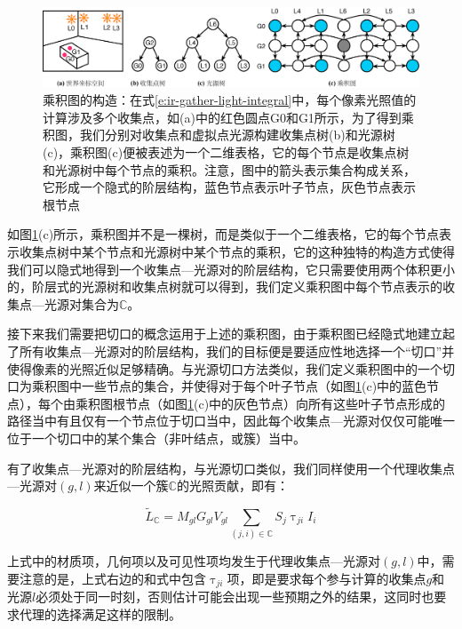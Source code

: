 \begin{figure}
\begin{fullwidth}
	\includegraphics[width=\thewidth]{figures/ir/product-graph}
	\caption{乘积图的构造：在式\ref{e:ir-gather-light-integral}中，每个像素光照值的计算涉及多个收集点，如(a)中的红色圆点G0和G1所示，为了得到乘积图，我们分别对收集点和虚拟点光源构建收集点树(b)和光源树(c)，乘积图(c)便被表述为一个二维表格，它的每个节点是收集点树和光源树中每个节点的乘积。注意，图中的箭头表示集合构成关系，它形成一个隐式的阶层结构，蓝色节点表示叶子节点，灰色节点表示根节点}
	\label{f:ir-product-graph}
\end{fullwidth}
\end{figure}

如图\ref{f:ir-product-graph}(c)所示，乘积图并不是一棵树，而是类似于一个二维表格，它的每个节点表示收集点树中某个节点和光源树中某个节点的乘积，它的这种独特的构造方式使得我们可以隐式地得到一个收集点—光源对的阶层结构，它只需要使用两个体积更小的，阶层式的光源树和收集点树就可以得到，我们定义乘积图中每个节点表示的收集点—光源对集合为$\mathds{C}$。

接下来我们需要把切口的概念运用于上述的乘积图，由于乘积图已经隐式地建立起了所有收集点—光源对的阶层结构，我们的目标便是要适应性地选择一个“切口”并使得像素的光照近似足够精确。与光源切口方法类似，我们定义乘积图中的一个切口为乘积图中一些节点的集合，并使得对于每个叶子节点（如图\ref{f:ir-product-graph}(c)中的蓝色节点），每个由乘积图根节点（如图\ref{f:ir-product-graph}(c)中的灰色节点）向所有这些叶子节点形成的路径当中有且仅有一个节点位于切口当中，因此每个收集点—光源对仅仅可能唯一位于一个切口中的某个集合（非叶结点，或簇）当中。

有了收集点—光源对的阶层结构，与光源切口类似，我们同样使用一个代理收集点—光源对$(g,l)$来近似一个簇$\mathds{C}$的光照贡献，即有：

\begin{equation}\label{e:ir-multi-sublinear}
	\tilde{L}_{\mathds{C}}=M_{gl}G_{gl}V_{gl}\sum_{(j,i)\in\mathds{C}}S_j\uptau_{ji}I_i
\end{equation}

\noindent 上式中的材质项，几何项以及可见性项均发生于代理收集点—光源对$(g,l)$中，需要注意的是，上式右边的和式中包含$\uptau_{ji}$项，即是要求每个参与计算的收集点$g$和光源$l$必须处于同一时刻，否则估计可能会出现一些预期之外的结果，这同时也要求代理的选择满足这样的限制。


